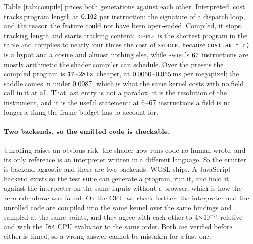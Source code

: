 

Table~\ref{tab:compile} prices both generations against each other. Interpreted,
cost tracks program length at $0.102$ per instruction: the signature of a
dispatch loop, and the reason the feature could not have been open-ended.
Compiled, it stops tracking length and starts tracking content: \textsc{ripple}
is the shortest program in the table and compiles to nearly four times the cost of
\textsc{saddle}, because \texttt{cos(tau * r)} is a hypot and a cosine and almost
nothing else, while \textsc{swirl}'s $67$ instructions are mostly
arithmetic the shader compiler can schedule. Over the presets the compiled program is
$37$--$281\times$ cheaper, at
$0.0050$--$0.055$\,ms per megapixel; the saddle comes in under
$0.0087$, which is what the same kernel costs with no field call in it at
all. That last entry is not a paradox, it is the resolution of the instrument, and
it is the useful statement: at $6$--$67$ instructions a field is
no longer a thing the frame budget has to account for.

\paragraph{Two backends, so the emitted code is checkable.}
Unrolling raises an obvious risk: the shader now runs code no human wrote, and
its only reference is an interpreter written in a different language. So the
emitter is backend-agnostic and there are two backends. WGSL ships. A JavaScript
backend exists so the test suite can generate a program, run it, and hold it
against the interpreter on the same inputs without a browser, which is how the
zero rule above was found. On the GPU we check further: the interpreter and the
unrolled code are compiled into the same kernel over the same bindings and
sampled at the same points, and they agree with each other to
$4{\times}10^{-5}$ relative and with the \texttt{f64} CPU evaluator to the same
order. Both are verified before either is timed, so a wrong answer cannot be
mistaken for a fast one.

